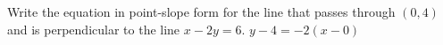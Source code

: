 {Write the equation in point-slope form for the line that passes through $(0,4)$ and is perpendicular to the line $x-2y=6$.}
{$y-4=-2(x-0)$}
